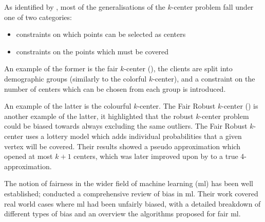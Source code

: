 As identified by \textcite{anegg_technique_2020}, most of the generalisations of the $k$-center problem fall under one of two categories:
\begin{itemize}
    \item constraints on which points can be selected as centers
    \item constraints on the points which must be covered
\end{itemize}

An example of the former is the fair $k$-center (\cite{kleindessner_fair_2019}), the clients are split into demographic groups (similarly to the colorful $k$-center), and a constraint on the number of centers which can be chosen from each group is introduced.

 An example of the latter is the colourful $k$-center. The Fair Robust $k$-center (\cite{harris_lottery_2017}) is another example of the latter, it highlighted that the robust $k$-center problem could be biased towards always excluding the same outliers. The Fair Robust $k$-center uses a lottery model which adds individual probabilities that a given vertex will be covered. Their results showed a pseudo approximation which opened at most $k+1$ centers, which was later improved upon by \citeauthor{anegg_technique_2020} to a true 4-approximation.

The notion of fairness in the wider field of machine learning (\acrshort{ml}) has been well established; \textcite{mehrabi_survey_2019} conducted a comprehensive review of bias in \acrshort{ml}. Their work covered real world cases where \acrshort{ml} had been unfairly biased, with a detailed breakdown of different types of bias and an overview the algorithms proposed for fair \acrshort{ml}.